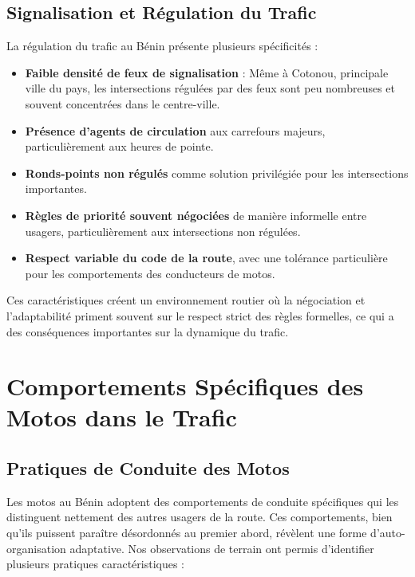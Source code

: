 \subsection{Signalisation et Régulation du Trafic}
\label{subsec:signalisation}

La régulation du trafic au Bénin présente plusieurs spécificités :

\begin{itemize}
\item \textbf{Faible densité de feux de signalisation} : Même à Cotonou, principale ville du pays, les intersections régulées par des feux sont peu nombreuses et souvent concentrées dans le centre-ville.

\item \textbf{Présence d'agents de circulation} aux carrefours majeurs, particulièrement aux heures de pointe.

\item \textbf{Ronds-points non régulés} comme solution privilégiée pour les intersections importantes.

\item \textbf{Règles de priorité souvent négociées} de manière informelle entre usagers, particulièrement aux intersections non régulées.

\item \textbf{Respect variable du code de la route}, avec une tolérance particulière pour les comportements des conducteurs de motos.
\end{itemize}

Ces caractéristiques créent un environnement routier où la négociation et l'adaptabilité priment souvent sur le respect strict des règles formelles, ce qui a des conséquences importantes sur la dynamique du trafic.

\section{Comportements Spécifiques des Motos dans le Trafic}
\label{sec:comportements_motos}

\subsection{Pratiques de Conduite des Motos}
\label{subsec:pratiques_conduite}

Les motos au Bénin adoptent des comportements de conduite spécifiques qui les distinguent nettement des autres usagers de la route. Ces comportements, bien qu'ils puissent paraître désordonnés au premier abord, révèlent une forme d'auto-organisation adaptative. Nos observations de terrain ont permis d'identifier plusieurs pratiques caractéristiques :

